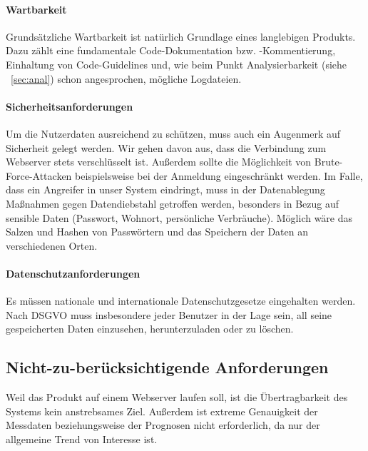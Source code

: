 \paragraph{Wartbarkeit}

Grundsätzliche Wartbarkeit ist natürlich Grundlage eines langlebigen Produkts.
Dazu zählt eine fundamentale Code-Dokumentation bzw. -Kommentierung, Einhaltung von Code-Guidelines und,
wie beim Punkt Analysierbarkeit (siehe ~\ref{sec:anal}) schon angesprochen, mögliche Logdateien.


\paragraph{Sicherheitsanforderungen}
Um die Nutzerdaten ausreichend zu schützen, muss auch ein Augenmerk auf Sicherheit gelegt werden.
Wir gehen davon aus, dass die Verbindung zum Webserver stets verschlüsselt ist.
Außerdem sollte die Möglichkeit von Brute-Force-Attacken beispielsweise bei der Anmeldung eingeschränkt werden.
Im Falle, dass ein Angreifer in unser System eindringt, muss in der Datenablegung Maßnahmen gegen Datendiebstahl
getroffen werden, besonders in Bezug auf sensible Daten (Passwort, Wohnort, persönliche Verbräuche).
Möglich wäre das Salzen und Hashen von Passwörtern und das Speichern der Daten an verschiedenen Orten.

\paragraph{Datenschutzanforderungen}
Es müssen nationale und internationale Datenschutzgesetze eingehalten werden.
Nach DSGVO muss insbesondere jeder Benutzer in der Lage sein, all seine gespeicherten Daten einzusehen,
herunterzuladen oder zu löschen.

\subsection{Nicht-zu-berücksichtigende Anforderungen}
Weil das Produkt auf einem Webserver laufen soll, ist die Übertragbarkeit des Systems kein anstrebsames Ziel.
Außerdem ist extreme Genauigkeit der Messdaten beziehungsweise der Prognosen nicht erforderlich,
da nur der allgemeine Trend von Interesse ist.